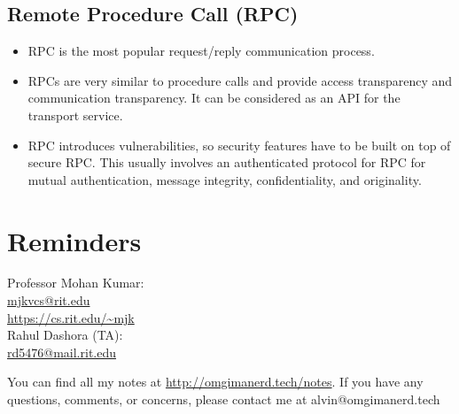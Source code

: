 \documentclass[letterpaper, 12pt]{math}
\begin{document}
\subsection*{Remote Procedure Call (RPC)}
\begin{itemize}
  \item RPC is the most popular request/reply communication process.
  \item RPCs are very similar to procedure calls and provide access
  transparency and communication transparency. It can be considered as an API
  for the transport service.
  \item RPC introduces vulnerabilities, so security features have to be built on
  top of secure RPC. This usually involves an authenticated protocol for RPC
  for mutual authentication, message integrity, confidentiality, and
  originality.
\end{itemize}

\section*{Reminders}
\noindent Professor Mohan Kumar: \\
\url{mjkvcs@rit.edu} \\
\url{https://cs.rit.edu/~mjk} \\

\noindent Rahul Dashora (TA): \\
\url{rd5476@mail.rit.edu} \\

\begin{center}
  You can find all my notes at \url{http://omgimanerd.tech/notes}. If you have
  any questions, comments, or concerns, please contact me at
  alvin@omgimanerd.tech
\end{center}
\end{document}
